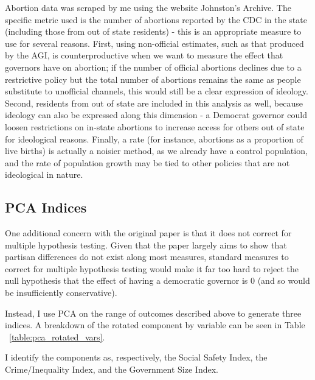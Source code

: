 \documentclass{article}
\begin{document}
Abortion data was scraped by me using the website Johnston's Archive. The specific metric used is the number of abortions reported by the CDC in the state (including those from out of state residents) - this is an appropriate measure to use for several reasons. First, using non-official estimates, such as that produced by the AGI, is counterproductive when we want to measure the effect that governors have on abortion; if the number of official abortions declines due to a restrictive policy but the total number of abortions remains the same as people substitute to unofficial channels, this would still be a clear expression of ideology. Second, residents from out of state are included in this analysis as well, because ideology can also be expressed along this dimension - a Democrat governor could loosen restrictions on in-state abortions to increase access for others out of state for ideological reasons. Finally, a rate (for instance, abortions as a proportion of live births) is actually a noisier method, as we already have a control population, and the rate of population growth may be tied to other policies that are not ideological in nature.

\subsection{PCA Indices}

One additional concern with the original paper is that it does not correct for multiple hypothesis testing. Given that the paper largely aims to show that partisan differences do not exist along most measures, standard measures to correct for multiple hypothesis testing would make it far too hard to reject the null hypothesis that the effect of having a democratic governor is 0 (and so would be insufficiently conservative). 

Instead, I use PCA on the range of outcomes described above to generate three indices. A breakdown of the rotated component by variable can be seen in Table ~\ref{table:pca_rotated_vars}.

I identify the components as, respectively, the Social Safety Index, the Crime/Inequality Index, and the Government Size Index. 
\end{document}
